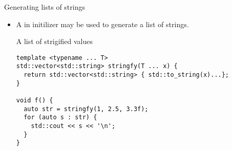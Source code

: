 \begin{frame}[t,fragile]{Generating lists of strings}
\begin{itemize}
  \item A  in initilizer may be used to generate a 
        list of strings.
\begin{block}{A list of strigified values}
\begin{lstlisting}
template <typename ... T>
std::vector<std::string> stringfy(T ... x) {
  return std::vector<std::string> { std::to_string(x)...};
}

void f() {
  auto str = stringfy(1, 2.5, 3.3f);
  for (auto s : str) {
    std::cout << s << '\n';
  }
}
\end{lstlisting}
\end{block}

\end{itemize}
\end{frame}
